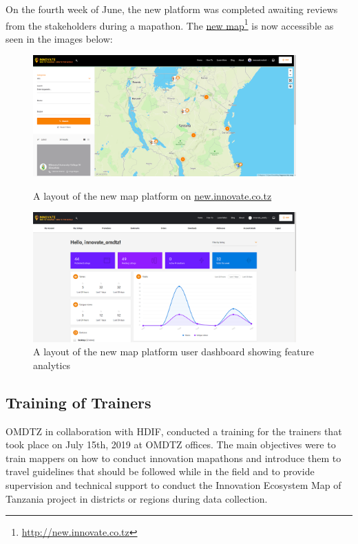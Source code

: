 \documentclass[a4paper,12pt,twoside]{article}
\begin{document}
On the fourth week of June, the new platform was completed awaiting reviews from the stakeholders during a mapathon. The \href{http://new.innovate.co.tz}{new map}\footnote{\url{http://new.innovate.co.tz}} is now accessible as seen in the images below:

\begin{figure}
	\includegraphics[width=0.9\textwidth]{images/new_new_inno_map.png}
	\caption{A layout of the new map platform on \href{http://new.innovate.co.tz}{new.innovate.co.tz }}
\bigskip \bigskip \bigskip \bigskip
	\includegraphics[width=0.9\textwidth]{images/dashboard.png}
	\caption{A layout of the new map platform user dashboard showing feature analytics }
\end{figure}

\newpage
\subsection{Training of Trainers}
OMDTZ in collaboration with HDIF, conducted a training for the trainers that took place on July 15th, 2019 at OMDTZ offices. The main objectives were to train mappers on how to conduct innovation mapathons and introduce them to travel guidelines that should be followed while in the field and to provide supervision and technical support to conduct the Innovation Ecosystem Map of Tanzania project in districts or regions during data collection.
\end{document}
